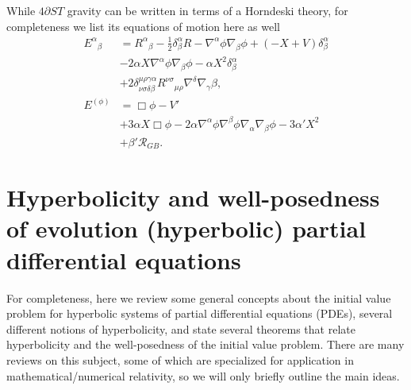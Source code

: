 \documentclass{ws-ijmpd}
\begin{document}
While $4\partial ST$ gravity can be written in terms of a Horndeski
theory, for completeness we list its equations of motion here as well
\begin{align}
   \label{eq:eom_4dst_tensor}
   E^{\alpha}{}_{\beta}
   &=
   R^{\alpha}{}_{\beta}
   -
   \frac{1}{2}\delta^{\alpha}_{\beta}R
   -
   \nabla^{\alpha}\phi\nabla_{\beta}\phi
   +
   \left(-X+V\right)\delta^{\alpha}_{\beta}
   \nonumber\\
   &-
   2\alpha X\nabla^{\alpha}\phi\nabla_{\beta}\phi
   -
   \alpha X^2\delta^{\alpha}_{\beta}
   \nonumber\\
   &+
   2\delta^{\mu\rho\gamma\alpha}_{\nu\sigma\delta\beta}
   R^{\nu\sigma}{}_{\mu\rho}
   \nabla^{\delta}\nabla_{\gamma}\beta
   ,\\
   \label{eq:eom_4dst_scalar}
   E^{(\phi)}
   &=
   \Box\phi - V'
   \nonumber\\
   &+
   3\alpha X\Box\phi
   -
   2\alpha 
   \nabla^{\alpha}\phi\nabla^{\beta}\phi\nabla_{\alpha}\nabla_{\beta}\phi
   -
   3\alpha' X^2
   \nonumber\\
   &+
   \beta'\mathcal{R}_{GB}
   .
\end{align}

\section{Hyperbolicity and well-posedness of evolution (hyperbolic) 
partial differential equations
\label{sec:review_hyperbolicity}
}

For completeness, here we review some general concepts about the
initial value problem for hyperbolic systems of partial
differential equations (PDEs),
several different notions of hyperbolicity, and state
several theorems that relate hyperbolicity and the well-posedness
of the initial value problem.
There are many reviews on this subject, some of which are
specialized for application in mathematical/numerical 
relativity\cite{courant1962methods,whitham2011linear,
kreiss_lorenz,Sarbach:2012pr,Hilditch:2013sba}, so we
will only briefly outline the main ideas.
\end{document}
